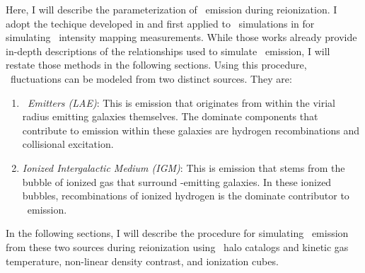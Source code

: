 Here, I will describe the parameterization of \lya\ emission during reionization.
I adopt the techique developed in \cite{2013ApJ...763..132S} and first applied to \fastsim\ simulations
in \cite{2017ApJ...848...52H} for simulating \lya\ intensity mapping measurements.
While those works already provide in-depth descriptions of the relationships used to simulate
\lya\ emission, I will restate those methods in the following sections. Using this
procedure, \lya\ fluctuations can be modeled from two distinct sources. They are:

\begin{enumerate}
\item \textit{\lya\ Emitters (LAE)}: This is emission that originates from within the
              virial radius \lya\-emitting galaxies themselves. The dominate components
              that contribute to emission within these galaxies are hydrogen recombinations
              and collisional excitation.
\item \textit{Ionized Intergalactic Medium (IGM)}: This is emission that stems from the bubble
              of ionized gas that surround \lya-emitting galaxies. In these ionized bubbles,
              recombinations of ionized hydrogen is the dominate contributor to \lya\ emission.
\end{enumerate}

In the following sections, I will describe the procedure for simulating \lya\
emission from these two sources during reionization using \fastsim\ halo catalogs
and kinetic gas temperature, non-linear density contrast, and ionization cubes.
